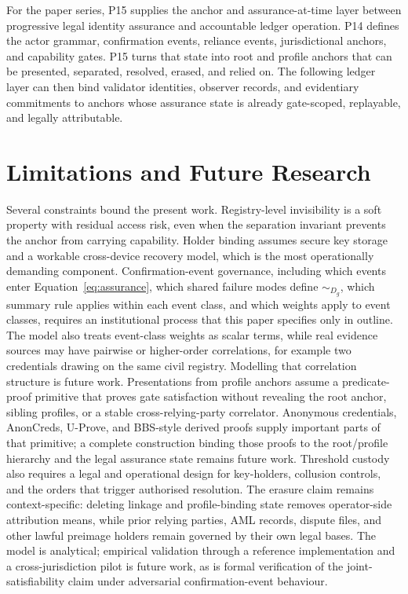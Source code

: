 \documentclass[oneside,10pt]{swissi}
\begin{document}
For the paper series, P15 supplies the anchor and assurance-at-time layer between progressive legal identity assurance and accountable ledger operation. P14 defines the actor grammar, confirmation events, reliance events, jurisdictional anchors, and capability gates. P15 turns that state into root and profile anchors that can be presented, separated, resolved, erased, and relied on. The following ledger layer can then bind validator identities, observer records, and evidentiary commitments to anchors whose assurance state is already gate-scoped, replayable, and legally attributable.

\bigskip

\section{Limitations and Future Research}
\label{sec:limitations}

Several constraints bound the present work. Registry-level invisibility is a soft property with residual access risk, even when the separation invariant prevents the anchor from carrying capability. Holder binding assumes secure key storage and a workable cross-device recovery model, which is the most operationally demanding component. Confirmation-event governance, including which events enter Equation~\eqref{eq:assurance}, which shared failure modes define $\sim_{D_g}$, which summary rule applies within each event class, and which weights apply to event classes, requires an institutional process that this paper specifies only in outline. The model also treats event-class weights as scalar terms, while real evidence sources may have pairwise or higher-order correlations, for example two credentials drawing on the same civil registry. Modelling that correlation structure is future work. Presentations from profile anchors assume a predicate-proof primitive that proves gate satisfaction without revealing the root anchor, sibling profiles, or a stable cross-relying-party correlator. Anonymous credentials, AnonCreds, U-Prove, and BBS-style derived proofs supply important parts of that primitive; a complete construction binding those proofs to the root/profile hierarchy and the legal assurance state remains future work.\cite{camenisch2001anoncreds,uprove2013,w3c2026bbs,anoncreds2026} Threshold custody also requires a legal and operational design for key-holders, collusion controls, and the orders that trigger authorised resolution. The erasure claim remains context-specific: deleting linkage and profile-binding state removes operator-side attribution means, while prior relying parties, AML records, dispute files, and other lawful preimage holders remain governed by their own legal bases. The model is analytical; empirical validation through a reference implementation and a cross-jurisdiction pilot is future work, as is formal verification of the joint-satisfiability claim under adversarial confirmation-event behaviour.

\bigskip

\bigskip

\printbibliography

\swDeclarationsPage
\end{document}
